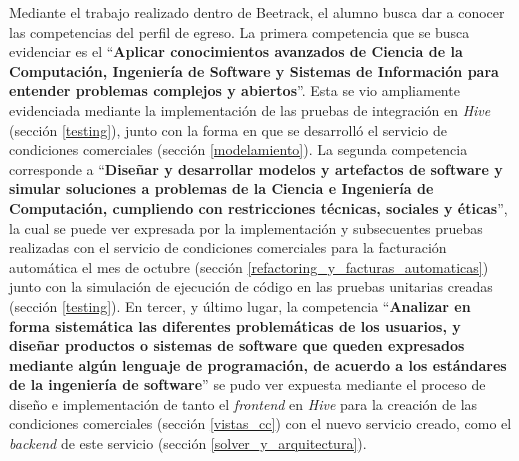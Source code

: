 Mediante el trabajo realizado dentro de Beetrack, el alumno busca dar a conocer las competencias del perfil de egreso. La primera competencia que se busca evidenciar es el ``\textbf{Aplicar conocimientos avanzados de Ciencia de la Computación, Ingeniería de Software y Sistemas de Información para entender problemas complejos y abiertos}''. Esta se vio ampliamente evidenciada mediante la implementación de las pruebas de integración en \textit{Hive} (sección \ref{testing}), junto con la forma en que se desarrolló el servicio de condiciones comerciales (sección \ref{modelamiento}). La segunda competencia corresponde a ``\textbf{Diseñar y desarrollar modelos y artefactos de software y simular soluciones a problemas de la Ciencia e Ingeniería de Computación, cumpliendo con restricciones técnicas, sociales y éticas}'', la cual se puede ver expresada por la implementación y subsecuentes pruebas realizadas con el servicio de condiciones comerciales para la facturación automática el mes de octubre (sección \ref{refactoring_y_facturas_automaticas}) junto con la simulación de ejecución de código en las pruebas unitarias creadas (sección \ref{testing}). En tercer, y último lugar, la competencia ``\textbf{Analizar en forma sistemática las diferentes problemáticas de los usuarios, y diseñar productos o sistemas de software que queden expresados mediante algún lenguaje de programación, de acuerdo a los estándares de la ingeniería de software}'' se pudo ver expuesta mediante el proceso de diseño e implementación de tanto el \textit{frontend} en \textit{Hive} para la creación de las condiciones comerciales (sección \ref{vistas_cc}) con el nuevo servicio creado, como el \textit{backend} de este servicio (sección \ref{solver_y_arquitectura}).